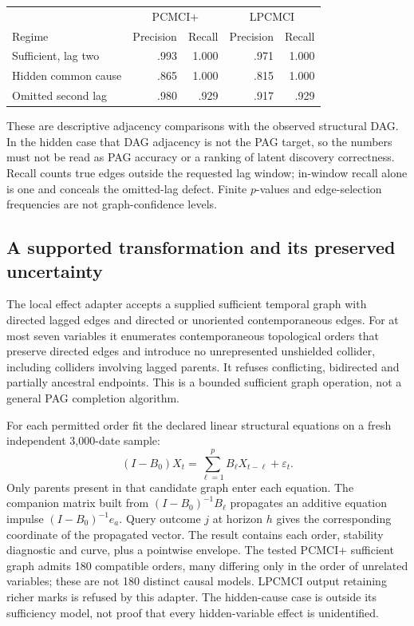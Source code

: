 \begin{center}\small
\begin{tabular}{lrrrr}\toprule
&\multicolumn{2}{c}{PCMCI+}&\multicolumn{2}{c}{LPCMCI}\\
Regime&Precision&Recall&Precision&Recall\\\midrule
Sufficient, lag two&.993&1.000&.971&1.000\\
Hidden common cause&.865&1.000&.815&1.000\\
Omitted second lag&.980&.929&.917&.929\\\bottomrule
\end{tabular}\end{center}
These are descriptive adjacency comparisons with the observed structural
DAG. In the hidden case that DAG adjacency is not the PAG target, so the
numbers must not be read as PAG accuracy or a ranking of latent discovery
correctness. Recall counts true edges outside the requested lag window;
in-window recall alone is one and conceals the omitted-lag defect. Finite
$p$-values and edge-selection frequencies are not graph-confidence levels.

\subsection{A supported transformation and its preserved uncertainty}
The local effect adapter accepts a supplied sufficient temporal graph with
directed lagged edges and directed or unoriented contemporaneous edges. For
at most seven variables it enumerates contemporaneous topological orders
that preserve directed edges and introduce no unrepresented unshielded
collider, including colliders involving lagged parents. It refuses conflicting,
bidirected and partially ancestral endpoints. This is a bounded sufficient
graph operation, not a general PAG completion algorithm.

For each permitted order fit the declared linear structural equations on a
fresh independent 3,000-date sample:
\[
 (I-B_0)X_t=\sum_{\ell=1}^p B_\ell X_{t-\ell}+\varepsilon_t.
\]
Only parents present in that candidate graph enter each equation. The
companion matrix built from $(I-B_0)^{-1}B_\ell$ propagates an additive
equation impulse $(I-B_0)^{-1}e_a$. Query outcome $j$ at horizon $h$ gives
the corresponding coordinate of the propagated vector. The result contains
each order, stability diagnostic and curve, plus a pointwise envelope.
The tested PCMCI+ sufficient graph admits 180 compatible orders, many
differing only in the order of unrelated variables; these are not 180
distinct causal models. LPCMCI output retaining richer marks is refused
by this adapter. The hidden-cause case is outside its sufficiency model,
not proof that every hidden-variable effect is unidentified.


